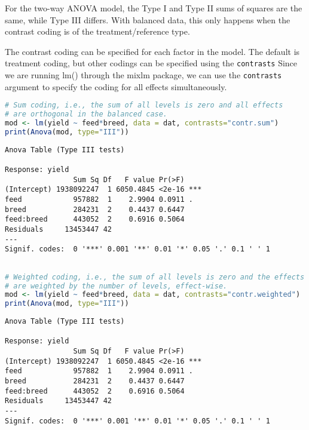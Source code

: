 For the two-way ANOVA model, the Type I and Type II sums of squares are
the same, while Type III differs. With balanced data, this only happens
when the contrast coding is of the treatment/reference type.

\label{contrast-codings}

The contrast coding can be specified for each factor in the model. The
default is treatment coding, but other codings can be specified using
the \texttt{contrasts} Since we are running lm() through the mixlm
package, we can use the \texttt{contrasts} argument to specify the
coding for all effects simultaneously.

\begin{lstlisting}[language=R, columns=fullflexible, basicstyle=\linespread{0.85}\small\ttfamily, stringstyle=\color{DarkGreen}, keywordstyle=\color{blue}, commentstyle=\color{DarkGreen},]
# Sum coding, i.e., the sum of all levels is zero and all effects
# are orthogonal in the balanced case.
mod <- lm(yield ~ feed*breed, data = dat, contrasts="contr.sum")
print(Anova(mod, type="III"))
\end{lstlisting}
\begin{Verbatim}[fontsize=\small]
Anova Table (Type III tests)

Response: yield
                Sum Sq Df   F value Pr(>F)
(Intercept) 1938092247  1 6050.4845 <2e-16 ***
feed            957882  1    2.9904 0.0911 .
breed           284231  2    0.4437 0.6447
feed:breed      443052  2    0.6916 0.5064
Residuals     13453447 42
---
Signif. codes:  0 '***' 0.001 '**' 0.01 '*' 0.05 '.' 0.1 ' ' 1
\end{Verbatim}
\begin{lstlisting}[language=R, columns=fullflexible, basicstyle=\linespread{0.85}\small\ttfamily, stringstyle=\color{DarkGreen}, keywordstyle=\color{blue}, commentstyle=\color{DarkGreen},]

# Weighted coding, i.e., the sum of all levels is zero and the effects
# are weighted by the number of levels, effect-wise.
mod <- lm(yield ~ feed*breed, data = dat, contrasts="contr.weighted")
print(Anova(mod, type="III"))
\end{lstlisting}
\begin{Verbatim}[fontsize=\small]
Anova Table (Type III tests)

Response: yield
                Sum Sq Df   F value Pr(>F)
(Intercept) 1938092247  1 6050.4845 <2e-16 ***
feed            957882  1    2.9904 0.0911 .
breed           284231  2    0.4437 0.6447
feed:breed      443052  2    0.6916 0.5064
Residuals     13453447 42
---
Signif. codes:  0 '***' 0.001 '**' 0.01 '*' 0.05 '.' 0.1 ' ' 1
\end{Verbatim}

